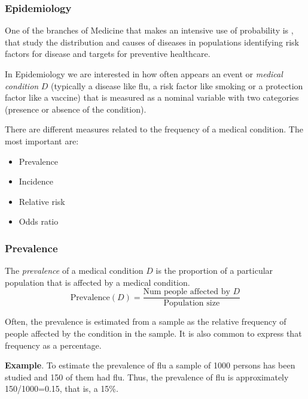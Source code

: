 \begin{frame}
\frametitle{Epidemiology}
One of the branches of Medicine that makes an intensive use of probability is , that study the distribution and causes of diseases in populations identifying risk factors for disease and targets for preventive healthcare.

In Epidemiology we are interested in how often appears an event or \emph{medical condition} $D$ (typically a disease like flu, a risk factor like smoking or a protection factor like a vaccine) that is measured as a nominal variable with two categories (presence or absence of the condition). 

There are different measures related to the frequency of a medical condition.
The most important are:
\begin{itemize}
  \item Prevalence
  \item Incidence
  \item Relative risk
  \item Odds ratio
\end{itemize}
\end{frame}


\begin{frame}
\frametitle{Prevalence}
\begin{definition}[Prevalence]
The \emph{prevalence} of a medical condition $D$ is the proportion of a particular population that is affected by a medical condition.
\[
  \mbox{Prevalence}(D) = \frac{\mbox{Num people affected by $D$}}{\mbox{Population size}}
\]
\end{definition}

Often, the prevalence is estimated from a sample as the relative frequency of people affected by the condition in the sample.
It is also common to express that frequency as a percentage. 

\textbf{Example}. To estimate the prevalence of flu a sample of 1000 persons has been studied and 150 of them had flu. 
Thus, the prevalence of flu is approximately 150/1000=0.15, that is, a 15\%. 

\end{frame}
  

